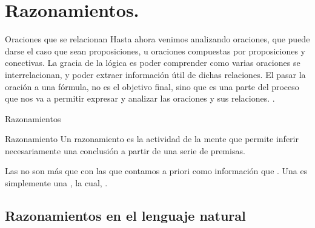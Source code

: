 
\section{Razonamientos.}


\begin{frame}{Oraciones que se relacionan}
  Hasta ahora venimos analizando oraciones, que puede darse el caso que sean
  proposiciones, u oraciones compuestas por proposiciones y conectivas.
  \jump
  La gracia de la lógica es poder comprender como varias oraciones se
  interrelacionan, y poder extraer información útil de dichas relaciones.
  \jump
  El pasar la oración a una fórmula, no es el objetivo final, sino que es
  una parte del proceso que nos va a permitir expresar y analizar las oraciones
  y sus relaciones.
  \jump
  .
\end{frame}


\begin{frame}{Razonamientos}
  \begin{block}{Razonamiento}
    Un razonamiento es la actividad de la mente que permite inferir
    necesariamente una conclusión a partir de una serie de premisas.
  \end{block}
  \jump
  Las  no son más que  con las que
  contamos a priori como información que .
  \jump
  Una  es simplemente una , la
  cual, .
\end{frame}


\subsection{Razonamientos en el lenguaje natural}


